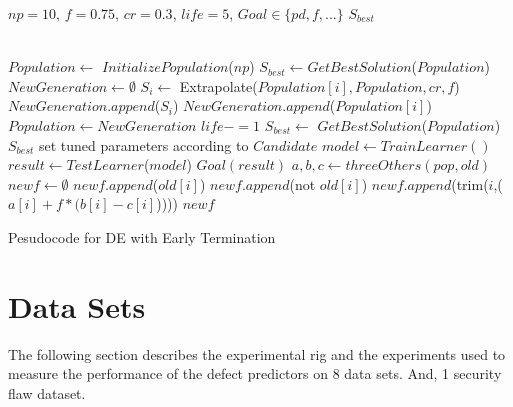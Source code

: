 \documentclass[12pt]{IEEEtran}
\begin{document}
\begin{algorithm}[htbp!]
  
  \scriptsize
  \begin{algorithmic}[1]
    \Require $\mathit{np} = 10$, $f=0.75$, $cr=0.3$, $\mathit{life} = 5$, $\mathit{Goal} \in \{\mathit{pd},f,...\}$
    \Ensure $S_{best}$
    
    ~\\
    \State $Population  \gets $ $InitializePopulation$($\mathit{np}$)   
    \State $S_{best} \gets $$GetBestSolution$($Population $)
    \State $NewGeneration \gets \emptyset$
    \State $S_i \gets$ Extrapolate($Population [i], Population , cr, f$)
    \State $NewGeneration$.$append$($S_i$)
    \Else
    \State $NewGeneration$.$append$($Population [i]$)
    \EndIf
    \EndFor
    \State $Population  \gets NewGeneration$
    \State $life -=1$
    \EndIf
    \State $S_{best} \gets$ $GetBestSolution$($Population $)
    \EndWhile
    \State \Return $S_{best}$
    \EndFunction
    \State set tuned parameters according to $Candidate$
    \State $model \gets$$TrainLearner()$
    \State $result \gets$$TestLearner$($model$)   
    \State \Return$\mathit{Goal}(result)$  
    \EndFunction
    \State $a, b, c\gets threeOthers(pop,old)$  
    \State $newf \gets \emptyset$
    \State $newf$.$append$($old[i]$)
    \Else
    \State $newf$.$append$(not $old[i]$)
    \Else
    \State $newf$.$append$(trim($i$,($a[i] + f * (b[i] - c[i]$)))) 
    \EndIf
    \EndIf
    \EndFor
    \State \Return $newf$
    \EndFunction
  \end{algorithmic} 
  \caption{Pesudocode for DE with Early Termination}
  \label{alg:DE}
\end{algorithm}



\section{Data Sets} \label{data}

The following section describes the experimental rig and the experiments used to measure the performance of the defect predictors on 8 data sets. And, 1 security flaw dataset.
\end{document}
